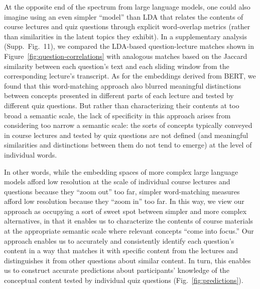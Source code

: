 \documentclass[10pt]{article}
\newcommand{\jaccard}{11}
\begin{document}
At the opposite end of the spectrum from large language models, one could also
imagine using an even simpler ``model'' than LDA that relates the
contents of course lectures and quiz questions through explicit word-overlap
metrics (rather than similarities in the latent topics they exhibit). In a
supplementary analysis (Supp.~Fig.~\jaccard), we compared the LDA-based
question-lecture matches shown in Figure~\ref{fig:question-correlations} with
analogous matches based on the Jaccard similarity between each question's text
and each sliding window from the corresponding lecture's transcript. As for
the embeddings derived from BERT, we found that this word-matching approach also blurred
meaningful distinctions between concepts presented in different parts of each
lecture and tested by different quiz questions. But rather than characterizing
their contents at too broad a semantic scale, the lack of specificity
in this approach arises from considering too narrow a semantic scale:
the sorts of concepts typically conveyed in course lectures and tested by quiz
questions are not defined (and meaningful similarities and distinctions between
them do not tend to emerge) at the level of individual words.

In other words, while the embedding spaces of more complex large language models
afford low resolution at the scale of individual course lectures and questions
because they ``zoom out'' too far, simpler word-matching measures afford low
resolution because they ``zoom in'' too far. In this way, we view our
approach as occupying a sort of sweet spot between simpler and more complex
alternatives, in that it enables us to characterize the contents of course
materials at the appropriate semantic scale where relevant concepts ``come into
focus.'' Our approach enables us to accurately and consistently identify each
question's content in a way that matches it with specific content from the
lectures and distinguishes it from other questions about similar content. In
turn, this enables us to construct accurate predictions about participants'
knowledge of the conceptual content tested by individual quiz questions
(Fig.~\ref{fig:predictions}).
\end{document}
